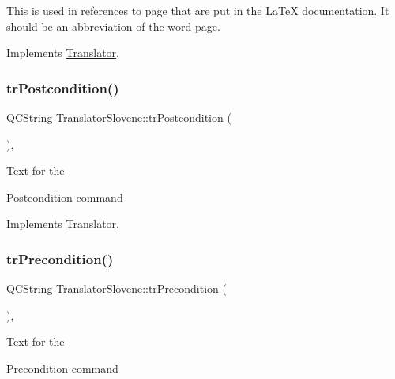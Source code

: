 This is used in references to page that are put in the La\+TeX documentation. It should be an abbreviation of the word page. 

Implements \mbox{\hyperlink{class_translator}{Translator}}.

\mbox{\label{class_translator_slovene_a4f9c88a5ce08e4ad3a12d6aa7b2cd03a}} 
\subsubsection{\texorpdfstring{trPostcondition()}{trPostcondition()}}
{\footnotesize\ttfamily \mbox{\hyperlink{class_q_c_string}{Q\+C\+String}} Translator\+Slovene\+::tr\+Postcondition (\begin{DoxyParamCaption}{ }\end{DoxyParamCaption})\hspace{0.3cm}{\ttfamily [inline]}, {\ttfamily [virtual]}}

Text for the \begin{DoxyPostcond}{Postcondition}
command 
\end{DoxyPostcond}


Implements \mbox{\hyperlink{class_translator}{Translator}}.

\mbox{\label{class_translator_slovene_a47ef8896ddf5f3b9cf3efcd64481a670}} 
\subsubsection{\texorpdfstring{trPrecondition()}{trPrecondition()}}
{\footnotesize\ttfamily \mbox{\hyperlink{class_q_c_string}{Q\+C\+String}} Translator\+Slovene\+::tr\+Precondition (\begin{DoxyParamCaption}{ }\end{DoxyParamCaption})\hspace{0.3cm}{\ttfamily [inline]}, {\ttfamily [virtual]}}

Text for the \begin{DoxyPrecond}{Precondition}
command 
\end{DoxyPrecond}


